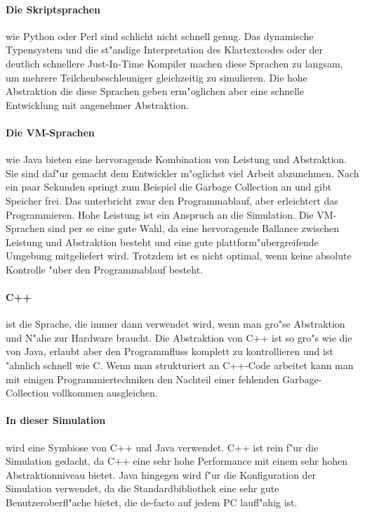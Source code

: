 \documentclass[14pt, a4paper]{report}
\begin{document}
\paragraph{Die Skriptsprachen} wie Python oder Perl sind schlicht nicht schnell genug.
Das dynamische Typensystem und die st"andige Interpretation des Klartextcodes oder 
der deutlich schnellere Just-In-Time Kompiler machen 
diese Sprachen zu langsam, um mehrere Teilchenbeschleuniger gleichzeitig zu 
simulieren. Die hohe Abstraktion die diese Sprachen geben erm"oglichen aber eine 
schnelle Entwicklung mit angenehmer Abstraktion.

\paragraph{Die VM-Sprachen} wie Java bieten eine hervoragende Kombination von 
Leistung und Abstraktion. Sie sind daf"ur gemacht dem Entwickler m"oglichst viel Arbeit
abzunehmen. Nach ein paar Sekunden springt zum Beispiel die Garbage Collection an und
gibt Speicher frei. Das unterbricht zwar den Programmablauf, aber erleichtert das Programmieren. 
Hohe Leistung ist ein Anspruch an die Simulation. Die VM-Sprachen sind 
per se eine gute Wahl, da eine hervoragende Ballance zwischen Leistung und Abstraktion 
besteht und eine gute plattform"ubergreifende Umgebung mitgeliefert wird. 
Trotzdem ist es nicht optimal, wenn keine absolute  Kontrolle "uber den Programmablauf besteht.

\paragraph{C++} ist die Sprache, die immer dann verwendet wird, wenn man gro"se 
Abstraktion und N"ahe zur Hardware braucht. Die Abstraktion von C++ ist so gro"s wie die
von Java, erlaubt aber den Programmfluss komplett zu kontrollieren
und ist "ahnlich schnell
wie C. Wenn man strukturiert an C++-Code arbeitet kann man mit einigen 
Programmiertechniken  
den Nachteil einer fehlenden Garbage-Collection vollkommen ausgleichen.

\paragraph{In dieser Simulation} wird eine Symbiose von C++ und Java verwendet. C++ ist rein f"ur 
die Simulation gedacht, da C++ eine sehr hohe Performance mit einem sehr hohen 
Abstraktionniveau bietet. Java hingegen wird f"ur die Konfiguration der 
Simulation verwendet, da die
Standardbibliothek eine sehr gute Benutzeroberfl"ache bietet, die de-facto auf jedem
PC lauff"ahig ist.
\end{document}
